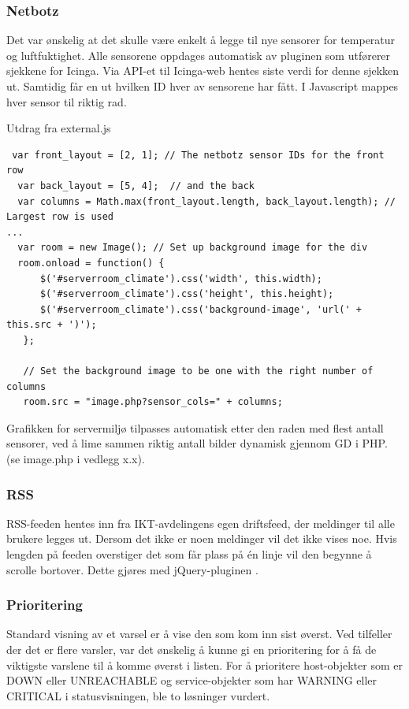 \subsubsection{Netbotz}

Det var ønskelig at det skulle være enkelt å legge til nye sensorer for temperatur og luftfuktighet. Alle sensorene oppdages automatisk av pluginen som utførerer sjekkene for Icinga. Via API-et til Icinga-web hentes siste verdi for denne sjekken ut. Samtidig får en ut hvilken ID hver av sensorene har fått. I Javascript mappes hver sensor til riktig rad.

Utdrag fra external.js
\begin{lstlisting}
 var front_layout = [2, 1]; // The netbotz sensor IDs for the front row
  var back_layout = [5, 4];  // and the back
  var columns = Math.max(front_layout.length, back_layout.length); // Largest row is used 
...
  var room = new Image(); // Set up background image for the div
  room.onload = function() {
      $('#serverroom_climate').css('width', this.width);
      $('#serverroom_climate').css('height', this.height);
      $('#serverroom_climate').css('background-image', 'url(' + this.src + ')');
   };

   // Set the background image to be one with the right number of columns
   room.src = "image.php?sensor_cols=" + columns;
\end{lstlisting}

Grafikken for servermiljø tilpasses automatisk etter den raden med flest antall sensorer, ved å lime sammen riktig antall bilder dynamisk gjennom GD i PHP. (se image.php i vedlegg x.x).

\subsubsection{RSS}

RSS-feeden hentes inn fra IKT-avdelingens egen driftsfeed, der meldinger til alle brukere legges ut. Dersom det ikke er noen meldinger vil det ikke vises noe. Hvis lengden på feeden overstiger det som får plass på én linje vil den begynne å scrolle bortover. Dette gjøres med jQuery-pluginen \cite{jqmarquee}.

\subsubsection{Prioritering}

Standard visning av et varsel er å vise den som kom inn sist øverst. Ved tilfeller der det er flere varsler, var det ønskelig å kunne gi en prioritering for å få de viktigste varslene til å komme øverst i listen. For å prioritere host-objekter som er DOWN eller UNREACHABLE og service-objekter som har WARNING eller CRITICAL i statusvisningen, ble to løsninger vurdert. 

